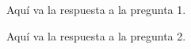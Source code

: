 \documentclass[letter]{article}
\begin{document}
	
	\begin{pregunta}{1} %
		Aquí va la respuesta a la pregunta 1.
	\end{pregunta}
	
	\begin{pregunta}{2}
		Aquí va la respuesta a la pregunta 2.
		
	\end{pregunta}
\end{document}
